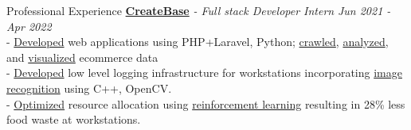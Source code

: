 \documentclass{resume} %
\begin{document}
\begin{rSection}{Professional Experience}
{\bf \href{https://createbase.work/}{CreateBase}} {\textit{- Full stack Developer Intern }} \hfill {\em Jun 2021 - Apr 2022} 
\\- \uline{Developed} web applications using PHP+Laravel, Python; \uline{crawled}, \uline{analyzed}, and \uline{visualized} ecommerce data
\\- \uline{Developed} low level logging infrastructure for workstations incorporating \uline{image recognition} using C++, OpenCV.
\\- \uline{Optimized} resource allocation using \uline{reinforcement learning} resulting in 28\% less food waste at workstations. 


\end{rSection}

\end{document}
